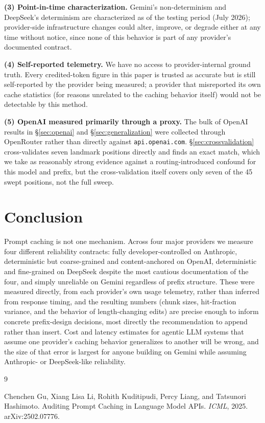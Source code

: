 \documentclass[11pt]{article}
\newcommand{\code}[1]{\texttt{#1}}
\begin{document}
\textbf{(3) Point-in-time characterization.} Gemini's non-determinism and
DeepSeek's determinism are characterized as of the testing period
(July 2026); provider-side infrastructure changes could alter, improve, or
degrade either at any time without notice, since none of this behavior is
part of any provider's documented contract.

\textbf{(4) Self-reported telemetry.} We have no access to provider-internal
ground truth. Every credited-token figure in this paper is trusted as
accurate but is still self-reported by the provider being measured; a
provider that misreported its own cache statistics (for reasons unrelated
to the caching behavior itself) would not be detectable by this method.

\textbf{(5) OpenAI measured primarily through a proxy.} The bulk of OpenAI
results in \S\ref{sec:openai} and \S\ref{sec:generalization} were
collected through OpenRouter rather than directly against
\code{api.openai.com}. \S\ref{sec:crossvalidation} cross-validates seven
landmark positions directly and finds an exact match, which we take as
reasonably strong evidence against a routing-introduced confound for this
model and prefix, but the cross-validation itself covers only seven of the
45 swept positions, not the full sweep.

\section{Conclusion}

Prompt caching is not one mechanism. Across four major providers we
measure four different reliability contracts: fully developer-controlled
on Anthropic, deterministic but coarse-grained and content-anchored on
OpenAI, deterministic and fine-grained on DeepSeek despite the most
cautious documentation of the four, and simply unreliable on Gemini
regardless of prefix structure. These were measured directly, from each
provider's own usage telemetry, rather than inferred from response
timing, and the resulting numbers (chunk sizes, hit-fraction variance, and
the behavior of length-changing edits) are precise enough to inform
concrete prefix-design decisions, most directly the recommendation to
append rather than insert. Cost and latency estimates for agentic LLM
systems that assume one provider's caching behavior generalizes to
another will be wrong, and the size of that error is largest for anyone
building on Gemini while assuming Anthropic- or DeepSeek-like reliability.

\begin{thebibliography}{9}

Chenchen Gu, Xiang Lisa Li, Rohith Kuditipudi, Percy Liang, and Tatsunori
Hashimoto. Auditing Prompt Caching in Language Model APIs. \emph{ICML},
2025. arXiv:2502.07776.

\end{thebibliography}
\end{document}
